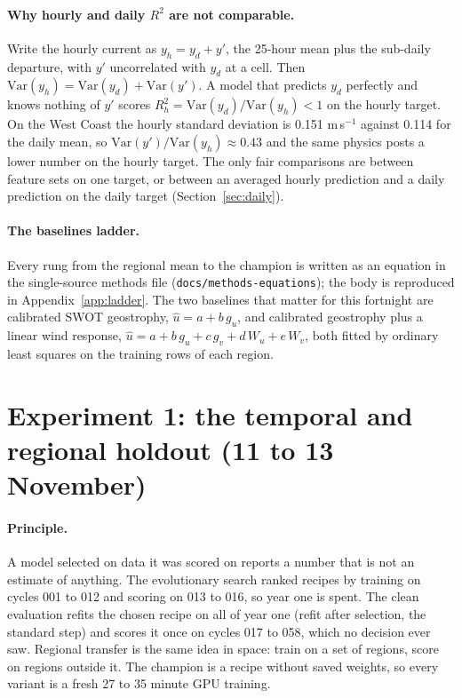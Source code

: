 \documentclass[11pt]{article}
\newcommand{\R}{R^2}
\newcommand{\code}[1]{\texttt{#1}}
\begin{document}
\paragraph{Why hourly and daily $\R$ are not comparable.} Write the hourly current as $y_h = y_d + y'$, the 25-hour mean plus the sub-daily departure, with $y'$ uncorrelated with $y_d$ at a cell. Then $\mathrm{Var}(y_h) = \mathrm{Var}(y_d) + \mathrm{Var}(y')$. A model that predicts $y_d$ perfectly and knows nothing of $y'$ scores $\R_h = \mathrm{Var}(y_d)/\mathrm{Var}(y_h) < 1$ on the hourly target. On the West Coast the hourly standard deviation is 0.151 m\,s$^{-1}$ against 0.114 for the daily mean, so $\mathrm{Var}(y')/\mathrm{Var}(y_h) \approx 0.43$ and the same physics posts a lower number on the hourly target. The only fair comparisons are between feature sets on one target, or between an averaged hourly prediction and a daily prediction on the daily target (Section~\ref{sec:daily}).

\paragraph{The baselines ladder.} Every rung from the regional mean to the champion is written as an equation in the single-source methods file (\code{docs/methods-equations}); the body is reproduced in Appendix~\ref{app:ladder}. The two baselines that matter for this fortnight are calibrated SWOT geostrophy, $\hat u = a + b\,g_u$, and calibrated geostrophy plus a linear wind response, $\hat u = a + b\,g_u + c\,g_v + d\,W_u + e\,W_v$, both fitted by ordinary least squares on the training rows of each region.

\section{Experiment 1: the temporal and regional holdout (11 to 13 November)}\label{sec:holdout}

\paragraph{Principle.} A model selected on data it was scored on reports a number that is not an estimate of anything. The evolutionary search ranked recipes by training on cycles 001 to 012 and scoring on 013 to 016, so year one is spent. The clean evaluation refits the chosen recipe on all of year one (refit after selection, the standard step) and scores it once on cycles 017 to 058, which no decision ever saw. Regional transfer is the same idea in space: train on a set of regions, score on regions outside it. The champion is a recipe without saved weights, so every variant is a fresh 27 to 35 minute GPU training.
\end{document}
